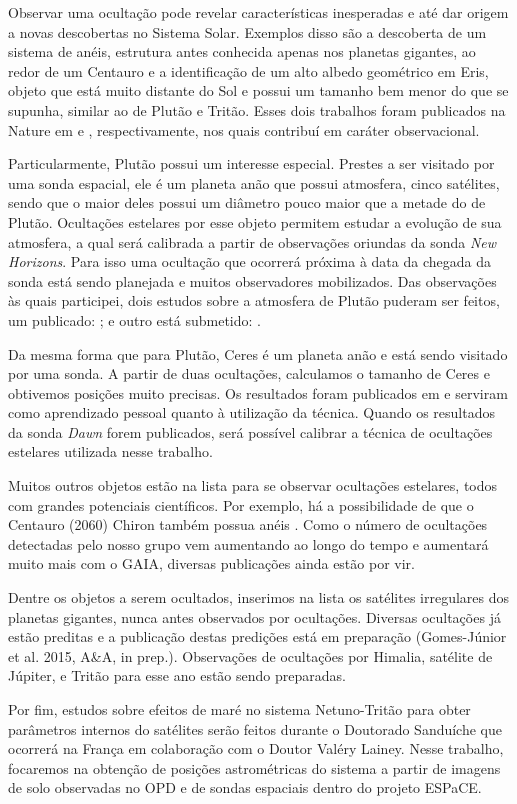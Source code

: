 \documentclass[12pt,a4paper]{monografia}
\begin{document}
Observar uma ocultação pode revelar características inesperadas e até dar origem a novas descobertas no Sistema Solar. Exemplos disso são a descoberta de um sistema de anéis, estrutura antes conhecida apenas nos planetas gigantes, ao redor de um Centauro e a identificação de um alto albedo geométrico em Eris, objeto que está muito distante do Sol e possui um tamanho bem menor do que se supunha, similar ao de Plutão e Tritão. Esses dois trabalhos foram publicados na Nature em \cite{BragaRibas2014} e \cite{Sicardy2011}, respectivamente, nos quais contribuí em caráter observacional.

Particularmente, Plutão possui um interesse especial. Prestes a ser visitado por uma sonda espacial, ele é um planeta anão que possui atmosfera, cinco satélites, sendo que o maior deles possui um diâmetro pouco maior que a metade do de Plutão. Ocultações estelares por esse objeto permitem estudar a evolução de sua atmosfera, a qual será calibrada a partir de observações oriundas da sonda \textit{New Horizons}. Para isso uma ocultação que ocorrerá próxima à data da chegada da sonda está sendo planejada e muitos observadores mobilizados. Das observações às quais participei, dois estudos sobre a atmosfera de Plutão puderam ser feitos, um publicado: \cite{Olkin2015}; e outro está submetido: \cite{DiasOliveira2015}.

Da mesma forma que para Plutão, Ceres é um planeta anão e está sendo visitado por uma sonda. A partir de duas ocultações, calculamos o tamanho de Ceres e obtivemos posições muito precisas. Os resultados foram publicados em \cite{GomesJunior2015-Ceres} e serviram como aprendizado pessoal quanto à utilização da técnica. Quando os resultados da sonda \textit{Dawn} forem publicados, será possível calibrar a técnica de ocultações estelares utilizada nesse trabalho.

Muitos outros objetos estão na lista para se observar ocultações estelares, todos com grandes potenciais científicos. Por exemplo, há a possibilidade de que o Centauro (2060) Chiron também possua anéis \citep{Ruprecht2015}. Como o número de ocultações detectadas pelo nosso grupo vem aumentando ao longo do tempo e aumentará muito mais com o GAIA, diversas publicações ainda estão por vir.

Dentre os objetos a serem ocultados, inserimos na lista os satélites irregulares dos planetas gigantes, nunca antes observados por ocultações. Diversas ocultações já estão preditas e a publicação destas predições está em preparação (Gomes-Júnior et al. 2015, A\&A, in prep.). Observações de ocultações por Himalia, satélite de Júpiter, e Tritão para esse ano estão sendo preparadas.

Por fim, estudos sobre efeitos de maré no sistema Netuno-Tritão para obter parâmetros internos do satélites serão feitos durante o Doutorado Sanduíche que ocorrerá na França em colaboração com o Doutor Valéry Lainey. Nesse trabalho, focaremos na obtenção de posições astrométricas do sistema a partir de imagens de solo observadas no OPD e de sondas espaciais dentro do projeto ESPaCE.




\end{document}
